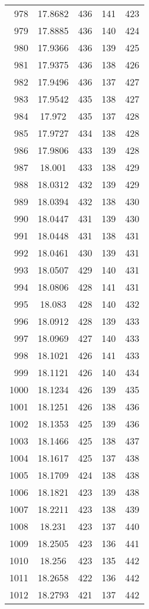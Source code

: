 \documentclass[12pt,a4paper]{article}
\begin{document}
\begin{tabular}{r|cccc}
	978 & 17.8682 & 436 & 141 & 423 \\
	979 & 17.8885 & 436 & 140 & 424 \\
	980 & 17.9366 & 436 & 139 & 425 \\
	981 & 17.9375 & 436 & 138 & 426 \\
	982 & 17.9496 & 436 & 137 & 427 \\
	983 & 17.9542 & 435 & 138 & 427 \\
	984 & 17.972 & 435 & 137 & 428 \\
	985 & 17.9727 & 434 & 138 & 428 \\
	986 & 17.9806 & 433 & 139 & 428 \\
	987 & 18.001 & 433 & 138 & 429 \\
	988 & 18.0312 & 432 & 139 & 429 \\
	989 & 18.0394 & 432 & 138 & 430 \\
	990 & 18.0447 & 431 & 139 & 430 \\
	991 & 18.0448 & 431 & 138 & 431 \\
	992 & 18.0461 & 430 & 139 & 431 \\
	993 & 18.0507 & 429 & 140 & 431 \\
	994 & 18.0806 & 428 & 141 & 431 \\
	995 & 18.083 & 428 & 140 & 432 \\
	996 & 18.0912 & 428 & 139 & 433 \\
	997 & 18.0969 & 427 & 140 & 433 \\
	998 & 18.1021 & 426 & 141 & 433 \\
	999 & 18.1121 & 426 & 140 & 434 \\
	1000 & 18.1234 & 426 & 139 & 435 \\
	1001 & 18.1251 & 426 & 138 & 436 \\
	1002 & 18.1353 & 425 & 139 & 436 \\
	1003 & 18.1466 & 425 & 138 & 437 \\
	1004 & 18.1617 & 425 & 137 & 438 \\
	1005 & 18.1709 & 424 & 138 & 438 \\
	1006 & 18.1821 & 423 & 139 & 438 \\
	1007 & 18.2211 & 423 & 138 & 439 \\
	1008 & 18.231 & 423 & 137 & 440 \\
	1009 & 18.2505 & 423 & 136 & 441 \\
	1010 & 18.256 & 423 & 135 & 442 \\
	1011 & 18.2658 & 422 & 136 & 442 \\
	1012 & 18.2793 & 421 & 137 & 442 \\

\end{tabular}
\end{document}
